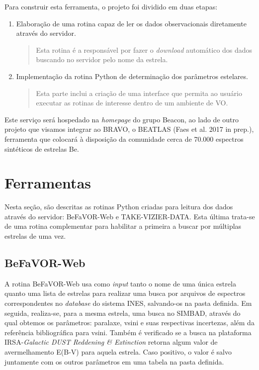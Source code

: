\documentclass[letterpaper,10pt,english]{sphinxmanual}
\begin{document}
Para construir esta ferramenta, o projeto foi dividido em duas etapas:
\begin{enumerate}
\item {} 
Elaboração de uma rotina capaz de ler os dados observacionais diretamente através do servidor.
\begin{quote}

Esta rotina é a responsável por fazer o \emph{download} automático dos dados buscando no servidor pelo nome da estrela.
\end{quote}

\item {} 
Implementação da rotina Python de determinação dos parâmetros estelares.
\begin{quote}

Esta parte inclui a criação de uma interface que permita ao usuário executar as rotinas de interesse dentro de um ambiente de VO.
\end{quote}

\end{enumerate}

Este serviço será hospedado na \emph{homepage} do grupo Beacon, ao lado de outro projeto que visamos integrar ao BRAVO, o BEATLAS (Faes et al. 2017 in prep.), ferramenta que colocará à disposição da comunidade cerca de 70.000 espectros sintéticos de estrelas Be.


\chapter{Ferramentas}
\label{index:ferramentas}
Nesta seção, são descritas as rotinas Python criadas para leitura dos dados através do servidor: BeFaVOR-Web e TAKE-VIZIER-DATA. Esta última trata-se de uma rotina complementar para habilitar a primeira a buscar por múltiplas estrelas de uma vez.


\section{BeFaVOR-Web}
\label{index:befavor-web}
A rotina BeFaVOR-Web usa como \emph{input} tanto o nome de uma única estrela quanto uma lista de estrelas para realizar uma busca por arquivos de espectros correspondentes no \emph{database} do sistema INES, salvando-os na pasta definida. Em seguida, realiza-se, para a mesma estrela, uma busca no SIMBAD, através do qual obtemos os parâmetros: paralaxe, vsini e suas respectivas incertezas, além da referência bibliográfica para vsini. Também é verificado se a busca na plataforma IRSA-\emph{Galactic DUST Reddening \& Extinction} retorna algum valor de avermelhamento E(B-V) para aquela estrela. Caso positivo, o valor é salvo juntamente com os outros parâmetros em uma tabela na pasta definida.
\end{document}

